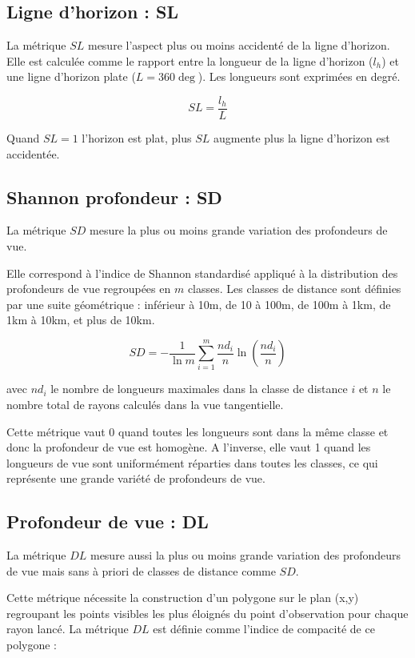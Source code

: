 \documentclass{report}
\begin{document}
\subsection{Ligne d'horizon : SL}

La métrique $SL$ mesure l'aspect plus ou moins accidenté de la ligne d'horizon. Elle est calculée comme le rapport entre la longueur de la ligne d'horizon ($l_h$) et une ligne d'horizon plate ($L=360\deg$). Les longueurs sont exprimées en degré. 

$$SL=\frac{l_h}{L}$$

Quand $SL=1$ l'horizon est plat, plus $SL$ augmente plus la ligne d'horizon est accidentée.

\subsection{Shannon profondeur : SD}
La métrique $SD$ mesure la plus ou moins grande variation des profondeurs de vue.

Elle correspond à l’indice de Shannon standardisé appliqué à la distribution des profondeurs de vue regroupées en $m$ classes. Les classes de distance sont définies par une suite géométrique : inférieur à 10m, de 10 à 100m, de 100m à 1km, de 1km à 10km, et plus de 10km.

$$SD = -\frac{1}{\ln m}\sum_{i=1}^{m}\frac{nd_i}{n}\ln\left(\frac{nd_i}{n}\right)$$

avec $nd_i$ le nombre de longueurs maximales dans la classe de distance $i$ et $n$ le nombre total de rayons calculés dans la vue tangentielle.

Cette métrique vaut 0 quand toutes les longueurs sont dans la même classe et donc la profondeur de vue est homogène. A l’inverse, elle vaut 1 quand les longueurs de vue sont uniformément réparties dans toutes les classes, ce qui représente une grande variété de profondeurs de vue.

\subsection{Profondeur de vue : DL}
La métrique $DL$ mesure aussi la plus ou moins grande variation des profondeurs de vue mais sans à priori de classes de distance comme $SD$.

Cette métrique nécessite la construction d’un polygone sur le plan (x,y) regroupant les points visibles les plus éloignés du point d’observation pour chaque rayon lancé. La métrique $DL$ est définie comme l’indice de compacité de ce polygone : 
\end{document}
